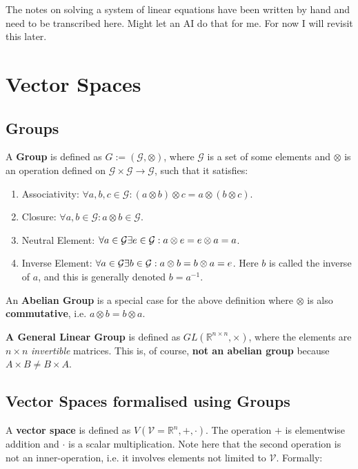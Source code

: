 The notes on solving a system of linear equations have been written by hand and need to be transcribed here. Might let an AI do that for me. For now I will revisit this later. 

\section{Vector Spaces}

\subsection{Groups}

A \textbf{Group} is defined as $G := (\mathcal{G}, \otimes)$, where $\mathcal{G}$ is a set of some elements and $\otimes$ is an operation defined on $\mathcal{G} \times \mathcal{G} \rightarrow \mathcal{G}$, such that it satisfies:

\begin{enumerate}
    \item Associativity: $\forall a, b, c \in \mathcal{G} : (a \otimes b) \otimes c = a \otimes (b \otimes c)$.
    \item Closure: $\forall a, b \in \mathcal{G} : a \otimes b \in \mathcal{G}$.
    \item Neutral Element: $\forall a \in \mathcal{G} \space \exists e \in \mathcal{G} : a \otimes e = e \otimes a = a$.
    \item Inverse Element: $\forall a \in \mathcal{G} \space \exists b \in \mathcal{G} : a \otimes b = b \otimes a = e$. Here $b$ is called the inverse of $a$, and this is generally denoted $b = a^{-1}$.
\end{enumerate}

An \textbf{Abelian Group} is a special case for the above definition where $\otimes$ is also \textbf{commutative}, i.e. $a \otimes b = b \otimes a$.

\textbf{A General Linear Group} is defined as $GL(\mathbb{R}^{n \times n}, \times)$, where the elements are $n \times n$ \textit{invertible} matrices. This is, of course, \textbf{not an abelian group} because $A \times B \neq B \times A$.

\subsection{Vector Spaces formalised using Groups}

A \textbf{vector space} is defined as $V(\mathcal{V} = \mathbb{R}^n, +, \cdot)$. The operation $+$ is elementwise addition and $\cdot$ is a scalar multiplication. Note here that the second operation is not an inner-operation, i.e. it involves elements not limited to $\mathcal{V}$. Formally:

